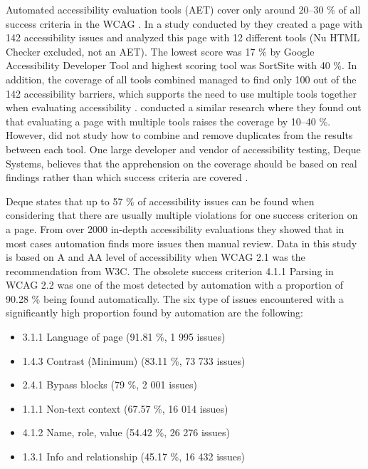 Automated accessibility evaluation tools (AET) cover only around 20--30 \% of all success criteria in the WCAG \citep{govukaccessibilityresults, webaimmillions, dequecoverage}. In a study conducted by \textcite{govukaccessibilityresults} they created a page with 142 accessibility issues and analyzed this page with 12 different tools (Nu HTML Checker excluded, not an AET). The lowest score was 17 \% by Google Accessibility Developer Tool and highest scoring tool was SortSite with 40 \%. In addition, the coverage of all tools combined managed to find only 100 out of the 142 accessibility barriers, which supports the need to use multiple tools together when evaluating accessibility \citep{govukaccessibilityresults_blog}. \textcite{comparison_10.1145/3371300.3383346} conducted a similar research where they found out that evaluating a page with multiple tools raises the coverage by 10--40 \%. However, \textcite{comparison_10.1145/3371300.3383346} did not study how to combine and remove duplicates from the results between each tool. One large developer and vendor of accessibility testing, Deque Systems, believes that the apprehension on the coverage should be based on real findings rather than which success criteria are covered \citep{dequecoverage}. 

Deque states that up to 57 \% of accessibility issues can be found when considering that there are usually multiple violations for one success criterion on a page. From over 2000 in-depth accessibility evaluations they showed that in most cases automation finds more issues then manual review. Data in this study is based on A and AA level of accessibility when WCAG 2.1 was the recommendation from W3C. The obsolete success criterion 4.1.1 Parsing in WCAG 2.2 was one of the most detected by automation with a proportion of 90.28 \% being found automatically. The six type of issues encountered with a significantly high proportion found by automation are the following: 

\begin{itemize}
  \item 3.1.1 Language of page (91.81 \%, 1 995 issues)
  \item 1.4.3 Contrast (Minimum) (83.11 \%, 73 733 issues)
  \item 2.4.1 Bypass blocks (79 \%, 2 001 issues)
  \item 1.1.1 Non-text context (67.57 \%, 16 014 issues)
  \item 4.1.2 Name, role, value (54.42 \%, 26 276 issues)
  \item 1.3.1 Info and relationship (45.17 \%, 16 432 issues)
\end{itemize}

